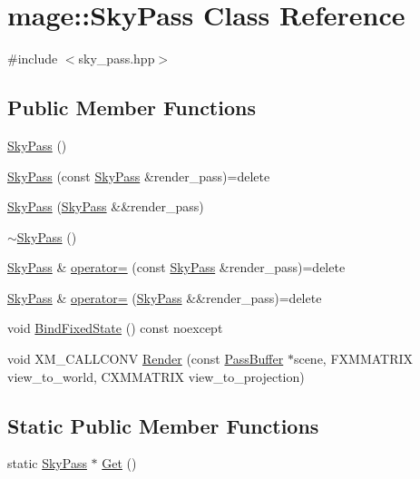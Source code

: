 \hypertarget{classmage_1_1_sky_pass}{}\section{mage\+:\+:Sky\+Pass Class Reference}
\label{classmage_1_1_sky_pass}


{\ttfamily \#include $<$sky\+\_\+pass.\+hpp$>$}

\subsection*{Public Member Functions}
\begin{DoxyCompactItemize}
\item 
\hyperlink{classmage_1_1_sky_pass_a41bb9d2d37f2c3a7bc5b12cffad9dafa}{Sky\+Pass} ()
\item 
\hyperlink{classmage_1_1_sky_pass_a78be688fecb0a4f55df78d4af01c4590}{Sky\+Pass} (const \hyperlink{classmage_1_1_sky_pass}{Sky\+Pass} \&render\+\_\+pass)=delete
\item 
\hyperlink{classmage_1_1_sky_pass_a6bd646c3f01beb171a19efe72b6cdbab}{Sky\+Pass} (\hyperlink{classmage_1_1_sky_pass}{Sky\+Pass} \&\&render\+\_\+pass)
\item 
\hyperlink{classmage_1_1_sky_pass_ab3e581e2eedfc62e13c71d91359f71ce}{$\sim$\+Sky\+Pass} ()
\item 
\hyperlink{classmage_1_1_sky_pass}{Sky\+Pass} \& \hyperlink{classmage_1_1_sky_pass_acfb9531772b437603825e43d17f4d983}{operator=} (const \hyperlink{classmage_1_1_sky_pass}{Sky\+Pass} \&render\+\_\+pass)=delete
\item 
\hyperlink{classmage_1_1_sky_pass}{Sky\+Pass} \& \hyperlink{classmage_1_1_sky_pass_ae15ed24b3bbf4008b90e4cfcb4117a84}{operator=} (\hyperlink{classmage_1_1_sky_pass}{Sky\+Pass} \&\&render\+\_\+pass)=delete
\item 
void \hyperlink{classmage_1_1_sky_pass_aa74c5e32a917aac610b2c7e4750c4639}{Bind\+Fixed\+State} () const noexcept
\item 
void X\+M\+\_\+\+C\+A\+L\+L\+C\+O\+NV \hyperlink{classmage_1_1_sky_pass_a0096c4f62d622033503245418a0e23df}{Render} (const \hyperlink{structmage_1_1_pass_buffer}{Pass\+Buffer} $\ast$scene, F\+X\+M\+M\+A\+T\+R\+IX view\+\_\+to\+\_\+world, C\+X\+M\+M\+A\+T\+R\+IX view\+\_\+to\+\_\+projection)
\end{DoxyCompactItemize}
\subsection*{Static Public Member Functions}
\begin{DoxyCompactItemize}
\item 
static \hyperlink{classmage_1_1_sky_pass}{Sky\+Pass} $\ast$ \hyperlink{classmage_1_1_sky_pass_af608935f6cb4b631512ee9c9eb6dec9d}{Get} ()
\end{DoxyCompactItemize}
